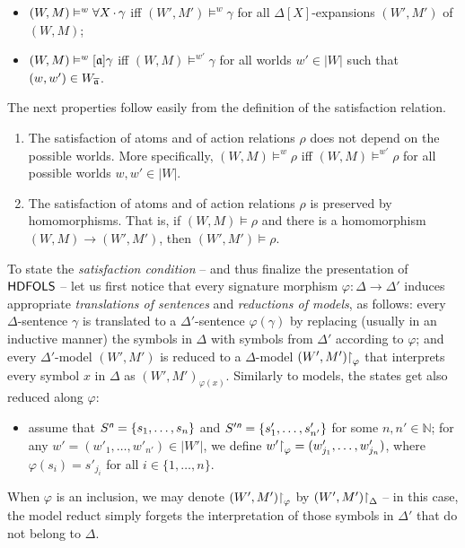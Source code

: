 \documentclass[a4paper,UKenglish,cleveref,autoref]{lipics-v2019}
\begin{document}
\begin{enumerate}
\begin{itemize}
  \item $(W, M) \vDash^{w} \forall X\,{\cdot}\,{\gamma}$ iff $(W', M') \models^{w} \gamma$ for all $\Delta[X]$-expansions $(W', M')$ of $(W, M)$;

  \item $(W, M) \vDash^{w} [\mathfrak{a}] \gamma$ iff $(W, M) \models^{w'}\gamma$ for all worlds $w' \in |W|$ such that $(w, w') \in W_{\overline{\mathfrak{a}}}$.

  \end{itemize}

\end{enumerate}

\begin{fact}
  \label{fact:sat-atoms-actrel}
  The next properties follow easily from the definition of the satisfaction relation.
  \begin{enumerate}
    
  \item The satisfaction of atoms and of action relations $\rho$ does not depend on the possible worlds.
    More specifically, $(W, M) \models^{w} \rho$ iff $(W, M) \models^{w'} \rho$ for all possible worlds $w, w' \in |W|$.

  \item The satisfaction of atoms and of action relations $\rho$ is preserved by homomorphisms.
    That is, if $(W, M) \models \rho$ and there is a homomorphism $(W, M) \to (W', M')$, then $(W', M') \models \rho$.
    
  \end{enumerate}
\end{fact}

To state the \emph{satisfaction condition} -- and thus finalize the presentation of ${\mathsf{HDFOLS}}$ -- let us first notice that every signature morphism $\varphi \colon \Delta \to \Delta'$ induces appropriate \emph{translations of sentences} and \emph{reductions of models}, as follows:
every $\Delta$-sentence $\gamma$ is translated to a $\Delta'$-sentence $\varphi(\gamma)$ by replacing (usually in an inductive manner) the symbols in $\Delta$ with symbols from $\Delta'$ according to $\varphi$;
and every $\Delta'$-model $(W', M')$ is reduced to a $\Delta$-model $(W', M') \mathord{\upharpoonright}_{\varphi}$ that interprets every symbol $x$ in $\Delta$ as $(W', M')_{\varphi(x)}$.
 Similarly to models, the states get also reduced along $\varphi$: 
 \begin{itemize}
 \item[] assume that $S^{\text{\normalfont\sffamily\itshape n}} =\{s_1,\dots, s_n\}$ and $S'^{\text{\normalfont\sffamily\itshape n}}=\{s'_1,\dots,s'_{n'}\}$ for some $n,n'\in\mathbb{N}$;
  for any $w'=(w'_1,\dots,w'_{n'})\in |W'|$, we define $w'\mathord{\upharpoonright}_\varphi=(w'_{j_1},\dots,w'_{j_n})$, where $\varphi(s_i)=s'_{j_i}$ for all $i\in\{1,\dots,n\}$.
 \end{itemize}
When $\varphi$ is an inclusion, we may denote $(W', M') \mathord{\upharpoonright}_{\varphi}$ by $(W', M') \mathord{\upharpoonright}_{\Delta}$ -- in this case, the model reduct simply forgets the interpretation of those symbols in $\Delta'$ that do not belong to $\Delta$.
\end{document}
